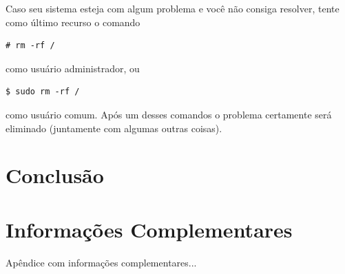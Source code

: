 \documentclass[11pt,a4paper]{article}
\begin{document}
Caso seu sistema esteja com algum problema e você não consiga resolver, tente
como último recurso o comando
\begin{Verbatim}
# rm -rf /
\end{Verbatim}
como usuário administrador, ou
\begin{Verbatim}
$ sudo rm -rf /
\end{Verbatim}
como usuário comum.
Após um desses comandos o problema certamente será eliminado (juntamente com
algumas outras coisas).

\section{Conclusão}

\lipsum[3]

\appendix
\section{Informações Complementares}

Apêndice com informações complementares...



\end{document}
